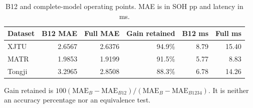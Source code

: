 \begin{table}[H]\centering
\caption{B12 and complete-model operating points. MAE is in SOH pp and latency in ms.}\label{tab:scost}
\papertablesize\setlength{\tabcolsep}{4pt}\renewcommand{\arraystretch}{1.15}
\begin{tabular}{lrrrrr}\toprule
Dataset & B12 MAE & Full MAE & Gain retained & B12 ms & Full ms \\ \midrule
XJTU & 2.6567 & 2.6376 & 94.9\% & 8.79 & 15.40 \\
MATR & 1.9853 & 1.9199 & 91.5\% & 5.77 & 8.83 \\
Tongji & 3.2965 & 2.8508 & 88.3\% & 6.78 & 14.26 \\
\bottomrule\end{tabular}
\par\smallskip\begin{minipage}{\linewidth}\papertablesize Gain retained is $100(\mathrm{MAE}_B-\mathrm{MAE}_{B12})/(\mathrm{MAE}_B-\mathrm{MAE}_{B1234})$. It is neither an accuracy percentage nor an equivalence test.\end{minipage}
\end{table}
